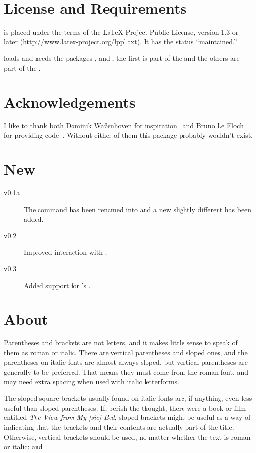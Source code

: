 \documentclass[DIV10,toc=index,toc=bib]{cnpkgdoc}
\begin{document}
\section{License and Requirements}
\embrac is placed under the terms of the LaTeX Project Public License,
version 1.3 or later (\url{http://www.latex-project.org/lppl.txt}).
It has the status ``maintained.''

\embrac loads and needs the packages ,  and
, the first is part of the  and the others are
part of the .

\section{Acknowledgements}
I like to thank both Dominik Waßenhoven for inspiration~\cite{dtk12-dw} and
Bruno Le Floch for providing code~\cite{lefloch11}. Without either of them this
package probably wouldn't exist.

\section{New}
\begin{description}
 \item[v0.1a] The command  has been renamed into
    and a new slightly different  has been added.
 \item[v0.2] Improved interaction with .
 \item[v0.3] Added support for 's .
\end{description}

\section{About}\label{sec:about}
\begin{zitat}
 Parentheses and brackets are not letters, and it makes little sense to speak of
 them as roman or italic. There are vertical parentheses and sloped ones, and
 the parentheses on italic fonts are almost always sloped, but vertical parentheses
 are generally to be preferred. That means they must come from the roman font,
 and may need extra spacing when used with italic letterforms.
 
 The sloped square brackets usually found on italic fonts are, if anything, even
 less useful than sloped parentheses. If, perish the thought, there were a book
 or film entitled \emph*{The View from My [sic] Bed}, sloped brackets might be
 useful as a way of indicating that the brackets and their contents are actually
 part of the title. Otherwise, vertical brackets should be used, no matter whether
 the text is roman or italic:  and
\end{zitat}
\end{document}
